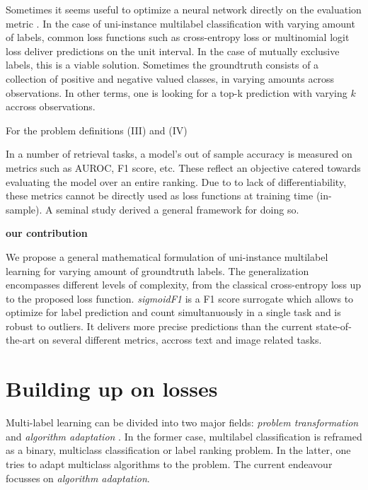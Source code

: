 \documentclass[sigconf,natbib,screen=true,review=true,anonymous]{acmart}
\begin{document}
Sometimes it seems useful to optimize a neural network directly on the evaluation metric \cite{optimizableLosses}. In the case of uni-instance multilabel classification with varying amount of labels, common loss functions such as cross-entropy loss or multinomial logit loss deliver predictions on the unit interval. In the case of mutually exclusive labels, this is a viable solution. Sometimes the groundtruth consists of a collection of positive and negative valued classes, in varying amounts across observations. In other terms, one is  looking for a top-k prediction with varying \(k\) accross observations.



For the problem definitions (III) and (IV)


In a number of retrieval tasks, a model's out of sample accuracy is measured on metrics such as AUROC, F1 score, etc. These reflect an objective catered towards evaluating the model over an entire ranking. Due to to lack of differentiability, these metrics cannot be directly used as loss functions at training time (in-sample). A seminal study \cite{optimizableLosses} derived a general framework for doing so. 

\textbf{\textbf{our contribution}}

We propose a general mathematical formulation of uni-instance multilabel learning for varying amount of groundtruth labels. The generalization encompasses different levels of complexity, from the classical cross-entropy loss up to the proposed loss function. \emph{sigmoidF1} is a F1 score surrogate which allows to optimize for label prediction and count simultanuously in a single task and is robust to outliers. It delivers more precise predictions than the current state-of-the-art on several different metrics, accross text and image related tasks.

\section{Building up on losses}
\label{sec:orgd0510a9}

Multi-label learning can be divided into two major fields: \emph{problem transformation} and \emph{algorithm adaptation} \cite{multilabelReview}. In the former case, multilabel classification is reframed as a binary, multiclass classification or label ranking problem. In the latter, one tries to adapt multiclass algorithms to the problem. The current endeavour focusses on \emph{algorithm adaptation}.
\end{document}
